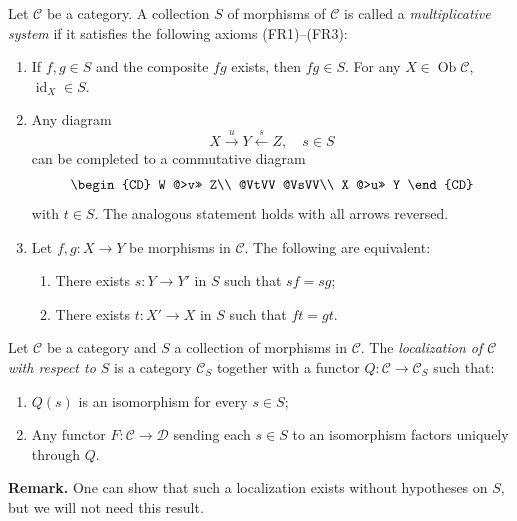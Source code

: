 \begin{definition*}
Let $\mathcal{C}$ be a category. A collection $S$ of morphisms of $\mathcal{C}$ is called a \emph{multiplicative system} if it satisfies the following axioms (FR1)--(FR3):
\begin{enumerate}
\item[(FR1)] If $f,g\in S$ and the composite $fg$ exists, then $fg\in S$. For any $X\in\operatorname{Ob}\mathcal{C}$, $\operatorname{id}_X\in S$.

\item[(FR2)] Any diagram
\[
X\xrightarrow{u} Y \xleftarrow{s} Z,\quad s\in S
\]
can be completed to a commutative diagram
\[
\begin{CD}
W @>v>> Z\\
@VtVV @VsVV\\
X @>u>> Y
\end{CD}
\]
with $t\in S$. The analogous statement holds with all arrows reversed.

\item[(FR3)] Let $f,g\colon X\to Y$ be morphisms in $\mathcal{C}$. The following are equivalent:
\begin{enumerate}
\item[(i)] There exists $s\colon Y\to Y'$ in $S$ such that $sf = sg$;
\item[(ii)] There exists $t\colon X'\to X$ in $S$ such that $ft = gt$.
\end{enumerate}
\end{enumerate}
\end{definition*}

\begin{definition*}
Let $\mathcal{C}$ be a category and $S$ a collection of morphisms in $\mathcal{C}$. The \emph{localization of $\mathcal{C}$ with respect to $S$} is a category $\mathcal{C}_S$ together with a functor $Q\colon\mathcal{C}\to\mathcal{C}_S$ such that:
\begin{enumerate}
\item[(a)] $Q(s)$ is an isomorphism for every $s\in S$;
\item[(b)] Any functor $F\colon\mathcal{C}\to\mathcal{D}$ sending each $s\in S$ to an isomorphism factors uniquely through $Q$.
\end{enumerate}
\end{definition*}
\textbf{Remark.}
	One can show that such a localization exists without
	hypotheses on $S$, but we will not need this result.

